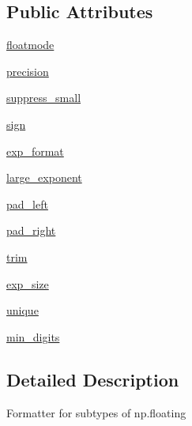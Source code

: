 \subsection*{Public Attributes}
\begin{DoxyCompactItemize}
\item 
\hyperlink{classnumpy_1_1core_1_1arrayprint_1_1FloatingFormat_a5c6295d9cfd715d5e1a06867eb596d3a}{floatmode}
\item 
\hyperlink{classnumpy_1_1core_1_1arrayprint_1_1FloatingFormat_a4433af57d181fdcafc6da7a9454e1945}{precision}
\item 
\hyperlink{classnumpy_1_1core_1_1arrayprint_1_1FloatingFormat_a9f035c8b6949e5d9b92e8e4294202bdd}{suppress\+\_\+small}
\item 
\hyperlink{classnumpy_1_1core_1_1arrayprint_1_1FloatingFormat_ae5bbf6c196629a25b53df15cca5a3a1a}{sign}
\item 
\hyperlink{classnumpy_1_1core_1_1arrayprint_1_1FloatingFormat_aa5d3172c717859f74721b1f399aa2e8b}{exp\+\_\+format}
\item 
\hyperlink{classnumpy_1_1core_1_1arrayprint_1_1FloatingFormat_ad1650e816f8bdfe0500941f3f233dd50}{large\+\_\+exponent}
\item 
\hyperlink{classnumpy_1_1core_1_1arrayprint_1_1FloatingFormat_a3cabfbc42b1b16b73729f28b0c9c7637}{pad\+\_\+left}
\item 
\hyperlink{classnumpy_1_1core_1_1arrayprint_1_1FloatingFormat_a808be56165705ccc873a2701bfe840d6}{pad\+\_\+right}
\item 
\hyperlink{classnumpy_1_1core_1_1arrayprint_1_1FloatingFormat_ab4c99b093d5dc7257379f5ede230a250}{trim}
\item 
\hyperlink{classnumpy_1_1core_1_1arrayprint_1_1FloatingFormat_a6fc660a59bb593d413489757e37cf43d}{exp\+\_\+size}
\item 
\hyperlink{classnumpy_1_1core_1_1arrayprint_1_1FloatingFormat_aa52080ad310e574e39210fb7ba02b512}{unique}
\item 
\hyperlink{classnumpy_1_1core_1_1arrayprint_1_1FloatingFormat_a6917ae2beddc77b68dd6c8ca5e980566}{min\+\_\+digits}
\end{DoxyCompactItemize}


\subsection{Detailed Description}
\begin{DoxyVerb}Formatter for subtypes of np.floating \end{DoxyVerb}
 

